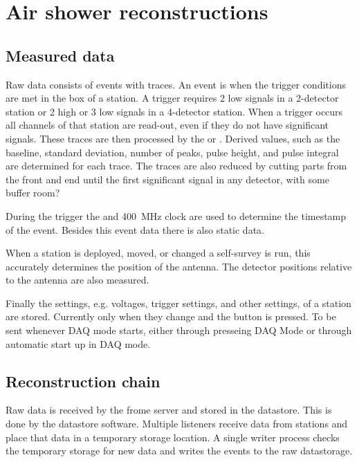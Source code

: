 \chapter{Air shower reconstructions}
\label{ch:analysis}


\section{Measured data}

Raw data consists of events with traces. An event is when the trigger
conditions are met in the \hisparc box of a station. A trigger requires
2 low signals in a 2-detector station or 2 high or 3 low signals in a
4-detector station. When a trigger occurs all \pmt channels of that
station are read-out, even if they do not have significant signals.
These traces are then processed by the \daq or \pysparc. Derived
values, such as the baseline, standard deviation, number of peaks,
pulse height, and pulse integral are determined for each trace. The traces
are also reduced by cutting parts from the front and end until the first
significant signal in any detector, with some buffer room?

During the trigger the \gps and \SI{400}{\mega\hertz} clock are used to
determine the \gps timestamp of the event. Besides this event data there
is also static data.

When a station is deployed, moved, or changed a \gps self-survey is run,
this accurately determines the position of the \gps antenna. The
detector positions relative to the \gps antenna are also measured.

Finally the settings, e.g. \pmt voltages, trigger settings, and other settings,
of a station are stored. Currently only when they change and the button is
pressed. To be sent whenever DAQ mode starts, either through presseing DAQ Mode
or through automatic start up in DAQ mode.



\section{Reconstruction chain}

Raw data is received by the frome server and stored in the \hisparc
datastore. This is done by the datastore software. Multiple listeners
receive data from stations and place that data in a temporary storage
location. A single writer process checks the temporary storage for new
data and writes the events to the raw datastorage.

